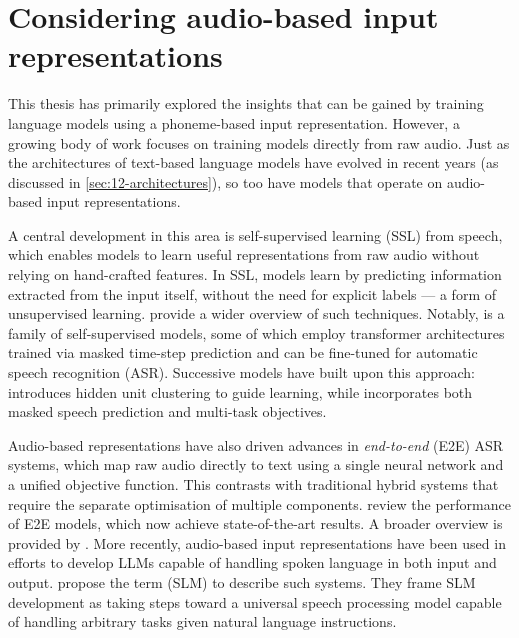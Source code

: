 
\section{Considering audio-based input representations}
\label{sec:17-audiomodels}

This thesis has primarily explored the insights that can be gained by training language models using a phoneme-based input representation. However, a growing body of work focuses on training models directly from raw audio. Just as the architectures of text-based language models have evolved in recent years (as discussed in \cref{sec:12-architectures}), so too have models that operate on audio-based input representations.

A central development in this area is self-supervised learning (SSL) from speech, which enables models to learn useful representations from raw audio without relying on hand-crafted features. In SSL, models learn by predicting information extracted from the input itself, without the need for explicit labels --- a form of unsupervised learning. \citet{mohamed2022self} provide a wider overview of such techniques. Notably,   \citep{baevski2020wav2vec} is a family of self-supervised models, some of which employ transformer architectures trained via masked time-step prediction and can be fine-tuned for automatic speech recognition (ASR). Successive models have built upon this approach:  \citep{hsu-2021-hubert} introduces hidden unit clustering to guide learning, while  \citep{chen2022wavlm} incorporates both masked speech prediction and multi-task objectives.

Audio-based representations have also driven advances in \emph{end-to-end} (E2E) ASR systems, which map raw audio directly to text using a single neural network and a unified objective function. This contrasts with traditional hybrid systems that require the separate optimisation of multiple components. \citet{li2022recent} review the performance of E2E models, which now achieve state-of-the-art results. A broader overview is provided by \citet{prabhavalkar2023end}. More recently, audio-based input representations have been used in efforts to develop LLMs capable of handling spoken language in both input and output. \citet{arora2025landscapespokenlanguagemodels} propose the term  (SLM) to describe such systems. They frame SLM development as taking steps toward a universal speech processing model capable of handling arbitrary tasks given natural language instructions.

